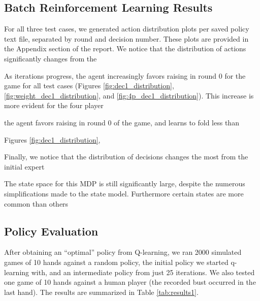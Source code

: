 \documentclass{article}
\begin{document}
\subsection{Batch Reinforcement Learning Results}
For all three test cases, we generated action distribution plots per saved policy text file, separated by round and decision number. These plots are provided in the Appendix section of the report. We notice that the distribution of actions significantly changes from the 


As iterations progress, the agent increasingly favors raising in round 0 for the game for all test cases (Figures \ref{fig:dec1_distribution}, \ref{fig:weight_dec1_distribution}, and \ref{fig:4p_dec1_distribution}). This increase is more evident for the four player

the agent favors raising in round 0 of the game, and learns to fold less than 

Figures \ref{fig:dec1_distribution}, 

Finally, we notice that the distribution of decisions changes the most from the initial expert 

The state space for this MDP is still significantly large, despite the numerous simplifications made to the state model. Furthermore certain states are more common than others




\subsection{Policy Evaluation} %
After obtaining an ``optimal'' policy from Q-learning, we ran 2000 simulated games of 10 hands against a random policy, the initial policy we started q-learning with, and an intermediate policy from just 25 iterations. We also tested one game of 10 hands against a human player (the recorded bust occurred in the last hand). The results are summarized in Table \ref{tab:results1}.
\end{document}
